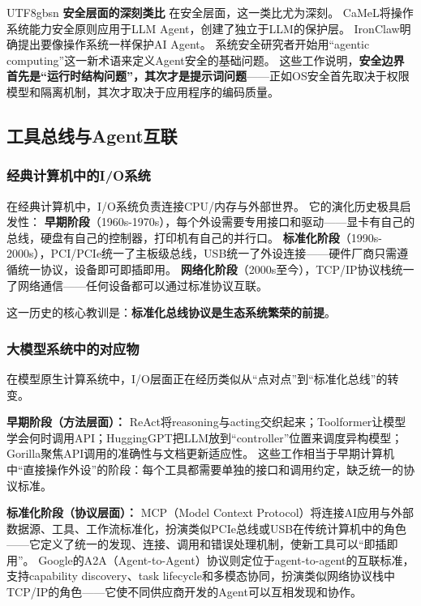 \documentclass[11pt,a4paper]{article}
\begin{document}
\begin{CJK*}{UTF8}{gbsn}
\textbf{安全层面的深刻类比}
在安全层面，这一类比尤为深刻。
CaMeL将操作系统能力安全原则应用于LLM Agent，创建了独立于LLM的保护层\cite{debenedetti2025camel}。
IronClaw明确提出要像操作系统一样保护AI Agent\cite{ironclaw2025}。
系统安全研究者开始用``agentic computing''这一新术语来定义Agent安全的基础问题\cite{agenticsecurity2025}。
这些工作说明，\textbf{安全边界首先是``运行时结构问题''，其次才是提示词问题}——正如OS安全首先取决于权限模型和隔离机制，其次才取决于应用程序的编码质量。

\subsection{工具总线与Agent互联}
\label{sec:io}

\subsubsection{经典计算机中的I/O系统}

在经典计算机中，I/O系统负责连接CPU/内存与外部世界。
它的演化历史极具启发性：
\textbf{早期阶段}（1960s-1970s），每个外设需要专用接口和驱动——显卡有自己的总线，硬盘有自己的控制器，打印机有自己的并行口。
\textbf{标准化阶段}（1990s-2000s），PCI/PCIe统一了主板级总线，USB统一了外设连接——硬件厂商只需遵循统一协议，设备即可即插即用。
\textbf{网络化阶段}（2000s至今），TCP/IP协议栈统一了网络通信——任何设备都可以通过标准协议互联。

这一历史的核心教训是：\textbf{标准化总线协议是生态系统繁荣的前提}。

\subsubsection{大模型系统中的对应物}

在模型原生计算系统中，I/O层面正在经历类似从``点对点''到``标准化总线''的转变。

\textbf{早期阶段（方法层面）：}
ReAct将reasoning与acting交织起来\cite{yao2023react}；Toolformer让模型学会何时调用API\cite{schick2023toolformer}；HuggingGPT把LLM放到``controller''位置来调度异构模型\cite{hugginggpt2023}；Gorilla聚焦API调用的准确性与文档更新适应性\cite{patil2024gorilla}。
这些工作相当于早期计算机中``直接操作外设''的阶段：每个工具都需要单独的接口和调用约定，缺乏统一的协议标准。

\textbf{标准化阶段（协议层面）：}
MCP（Model Context Protocol）将连接AI应用与外部数据源、工具、工作流标准化\cite{mcp_intro_2026}，扮演类似PCIe总线或USB在传统计算机中的角色——它定义了统一的发现、连接、调用和错误处理机制，使新工具可以``即插即用''。
Google的A2A（Agent-to-Agent）协议则定位于agent-to-agent的互联标准\cite{google_a2a_2025}，支持capability discovery、task lifecycle和多模态协同，扮演类似网络协议栈中TCP/IP的角色——它使不同供应商开发的Agent可以互相发现和协作。


\end{CJK*}
\end{document}
